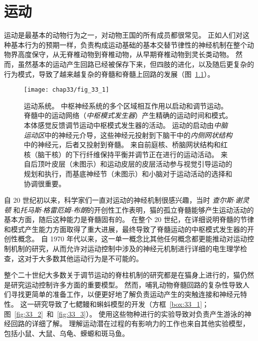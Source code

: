 \chapter{运动} \label{chap:chap33}

运动是最基本的动物行为之一，对动物王国的所有成员都很常见。
正如人们对这种基本行为的预期一样，负责构成运动基础的基本交替节律性的神经机制在整个动物界高度保守，从无脊椎动物到脊椎动物，从早期脊椎动物到灵长类动物。 
然而，虽然基本的运动产生回路已经被保存下来，但四肢的进化，以及随后更复杂的行为模式，导致了越来越复杂的脊髓和脊髓上回路的发展（图~\ref{fig:33_1}）。


\begin{figure}[htbp]
	\centering
	\texttt{[image: chap33/fig\_33\_1]}
	\caption{运动系统。
	中枢神经系统的多个区域相互作用以启动和调节运动。
	脊髓中的运动网络（\textit{中枢模式发生器}）产生精确的运动时间和模式。
	本体感觉反馈调节运动中枢模式发生器的活动。
	运动的启动由\textit{中脑运动区}中的神经元介导，这些神经元投射到下脑干中的\textit{内侧网状结构}中的神经元，后者又投射到脊髓。
	来自前庭核、桥脑网状结构和红核（脑干核）的下行纤维保持平衡并调节正在进行的运动活动。
	来自后顶叶皮层（未图示）和运动皮层的皮层活动参与视觉引导运动的规划和执行，而基底神经节（未图示）和小脑对于运动活动的选择和协调很重要。}
	\label{fig:33_1}
\end{figure}


自 20 世纪初以来，科学家们一直对运动的神经机制很感兴趣，当时 \textit{查尔斯$\cdot$谢灵顿} 和\textit{托马斯$\cdot$格雷厄姆-布朗}的开创性工作表明，猫的孤立脊髓能够产生运动活动的基本方面，随后这种能力是脊髓固有的。
在整个 20 世纪，在详细说明脊髓的节律和模式产生能力方面取得了重大进展，最终导致了脊髓运动的中枢模式发生器的开创性概念。
自 1970 年代以来，这一单一概念比其他任何概念都更能推动对运动控制机制的研究，从而允许对运动控制中涉及的神经元机制进行详细的电生理学检查，这对于大多数其他运动行为是不可能的。


整个二十世纪大多数关于调节运动的脊柱机制的研究都是在猫身上进行的，猫仍然是研究运动控制许多方面的重要模型。
然而，哺乳动物脊髓回路的复杂性导致人们寻找更简单的准备工作，以便更好地了解负责运动产生的突触连接和神经元特性。
这一研究导致了七鳃鳗和蝌蚪模型的开发（方框~\ref{box:33_1}；图~\ref{fig:33_2}~和~\ref{fig:33_3}）。
使用这些物种进行的实验导致对负责产生游泳的神经回路的详细了解。
理解运动潜在过程的有影响力的工作也来自其他实验模型，包括小鼠、大鼠、乌龟、蝾螈和斑马鱼。



